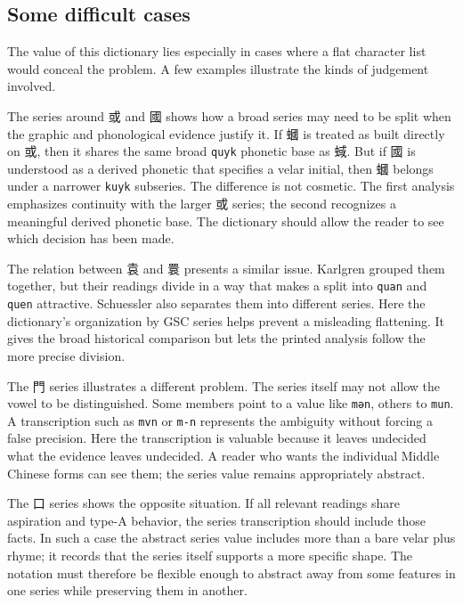 \subsection*{Some difficult cases}

The value of this dictionary lies especially in cases where a flat character list would conceal the problem. A few examples illustrate the kinds of judgement involved.

The series around 或 and 國 shows how a broad series may need to be split when the graphic and phonological evidence justify it. If 蟈 is treated as built directly on 或, then it shares the same broad \texttt{quyk} phonetic base as 蜮. But if 國 is understood as a derived phonetic that specifies a velar initial, then 蟈 belongs under a narrower \texttt{kuyk} subseries. The difference is not cosmetic. The first analysis emphasizes continuity with the larger 或 series; the second recognizes a meaningful derived phonetic base. The dictionary should allow the reader to see which decision has been made.

The relation between 袁 and 睘 presents a similar issue. Karlgren grouped them together, but their readings divide in a way that makes a split into \texttt{quan} and \texttt{quen} attractive. Schuessler also separates them into different series. Here the dictionary's organization by GSC series helps prevent a misleading flattening. It gives the broad historical comparison but lets the printed analysis follow the more precise division.

The 門 series illustrates a different problem. The series itself may not allow the vowel to be distinguished. Some members point to a value like \texttt{mən}, others to \texttt{mun}. A transcription such as \texttt{mvn} or \texttt{m-n} represents the ambiguity without forcing a false precision. Here the transcription is valuable because it leaves undecided what the evidence leaves undecided. A reader who wants the individual Middle Chinese forms can see them; the series value remains appropriately abstract.

The 口 series shows the opposite situation. If all relevant readings share aspiration and type-A behavior, the series transcription should include those facts. In such a case the abstract series value includes more than a bare velar plus rhyme; it records that the series itself supports a more specific shape. The notation must therefore be flexible enough to abstract away from some features in one series while preserving them in another.

